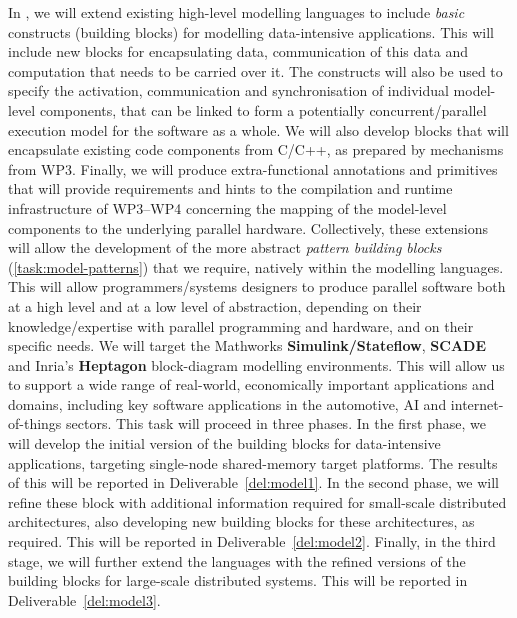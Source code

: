 \begin{Workpackage}{\thewpno}
\begin{Task}
\TaskResults{%
\ref{del:model1}
\ref{del:model2}
\ref{del:model3}
}
\TaskHeader{}

In \theTask, we will extend existing high-level modelling languages to include \emph{basic} constructs (building blocks) for modelling data-intensive applications. This will include new blocks for encapsulating data, communication of this data and computation that needs to be carried over it.
The constructs will also be used  to specify the activation, communication and
synchronisation of individual model-level components, that can be linked to form a potentially concurrent/parallel execution model
for the software as a whole. We will also develop blocks that will encapsulate existing code components from C/C++, as prepared by mechanisms from WP3.
Finally, we will produce extra-functional annotations and primitives that will provide requirements and hints to the compilation and  runtime infrastructure of WP3--WP4 
concerning the mapping of the model-level
components to the underlying parallel hardware. Collectively, these extensions
will allow the development of
the more abstract \emph{pattern building blocks} (\ref{task:model-patterns}) that we require, natively within the
modelling languages. This will allow programmers/systems designers to produce parallel software both
at a high level and at a low level of abstraction, depending on their knowledge/expertise
with parallel programming and hardware, and on their specific needs. 
%
We will target the Mathworks
\textbf{Simulink/Stateflow}, \textbf{SCADE} and Inria's \textbf{Heptagon} block-diagram modelling
environments. This will allow us to support a wide range of real-world, economically important
applications and domains, including key software applications in the automotive, AI and internet-of-things sectors.
This task will proceed in three phases. In the first phase,
we will develop the initial version of the building blocks for data-intensive applications, targeting single-node shared-memory target platforms. The results of this will be reported
in Deliverable~\ref{del:model1}. In the second phase, we will
refine these block with additional information required for small-scale distributed architectures, also developing new building blocks for these architectures, as required. This will be reported
in Deliverable~\ref{del:model2}. Finally, in the third stage, we will
further extend the languages with the refined versions of the
building blocks for large-scale distributed systems. This will be reported
in Deliverable~\ref{del:model3}.
\end{Task}



\end{Workpackage}
